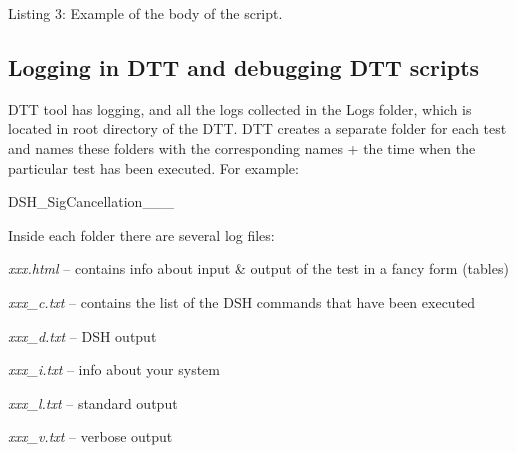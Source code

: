 \begin{DoxyCode}{0}
\DoxyCodeLine{}
\DoxyCodeLine{}
\DoxyCodeLine{      \textcolor{preprocessor}{\# make sure to close down dsh before returning}}
\DoxyCodeLine{        }
\end{DoxyCode}
 Listing 3\+: Example of the body of the script.



 \hypertarget{a00836_dtt_guide_04_logging_in_dtt_and_debuggin_dtt_scripts}{}\subsection{Logging in D\+T\+T and debugging D\+T\+T scripts}\label{a00836_dtt_guide_04_logging_in_dtt_and_debuggin_dtt_scripts}
 D\+TT tool has logging, and all the logs collected in the Logs folder, which is located in root directory of the D\+TT. D\+TT creates a separate folder for each test and names these folders with the corresponding names + the time when the particular test has been executed. For example\+:

{\ttfamily D\+S\+H\+\_\+\+Sig\+Cancellation\+\_\+\_\+\_}

Inside each folder there are several log files\+: 
\begin{DoxyItemize}
\item {\itshape xxx.\+html} – contains info about input \& output of the test in a fancy form (tables) 
\item {\itshape xxx\+\_\+c.\+txt} – contains the list of the D\+SH commands that have been executed 
\item {\itshape xxx\+\_\+d.\+txt} – D\+SH output 
\item {\itshape xxx\+\_\+i.\+txt} – info about your system 
\item {\itshape xxx\+\_\+l.\+txt} – standard output 
\item {\itshape xxx\+\_\+v.\+txt} – verbose output 
\end{DoxyItemize}

